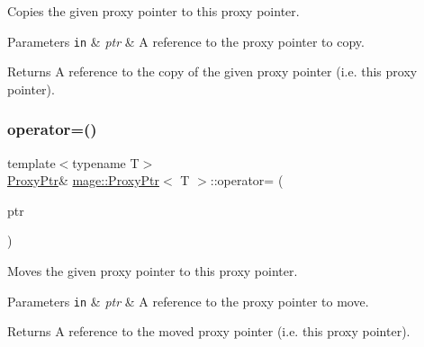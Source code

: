 Copies the given proxy pointer to this proxy pointer.


\begin{DoxyParams}[1]{Parameters}
\mbox{\tt in}  & {\em ptr} & A reference to the proxy pointer to copy. \\
\hline
\end{DoxyParams}
\begin{DoxyReturn}{Returns}
A reference to the copy of the given proxy pointer (i.\+e. this proxy pointer). 
\end{DoxyReturn}
\mbox{\label{classmage_1_1_proxy_ptr_a53e38a57d8155b8cd59b3d6e332995b7}} 
\subsubsection{\texorpdfstring{operator=()}{operator=()}\hspace{0.1cm}{\footnotesize\ttfamily [2/2]}}
{\footnotesize\ttfamily template$<$typename T$>$ \\
\mbox{\hyperlink{classmage_1_1_proxy_ptr}{Proxy\+Ptr}}\& \mbox{\hyperlink{classmage_1_1_proxy_ptr}{mage\+::\+Proxy\+Ptr}}$<$ T $>$\+::operator= (\begin{DoxyParamCaption}\item[{\mbox{\hyperlink{classmage_1_1_proxy_ptr}{Proxy\+Ptr}}$<$ T $>$ \&\&}]{ptr }\end{DoxyParamCaption})\hspace{0.3cm}{\ttfamily [noexcept]}}

Moves the given proxy pointer to this proxy pointer.


\begin{DoxyParams}[1]{Parameters}
\mbox{\tt in}  & {\em ptr} & A reference to the proxy pointer to move. \\
\hline
\end{DoxyParams}
\begin{DoxyReturn}{Returns}
A reference to the moved proxy pointer (i.\+e. this proxy pointer). 
\end{DoxyReturn}
\mbox{\label{classmage_1_1_proxy_ptr_a786d92c5d87ac0349a60cf99642bd890}} 
